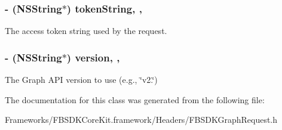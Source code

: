 \subsubsection[{token\+String}]{\setlength{\rightskip}{0pt plus 5cm}-\/ (N\+S\+String$\ast$) token\+String\hspace{0.3cm}{\ttfamily [read]}, {\ttfamily [nonatomic]}, {\ttfamily [copy]}}\label{interface_f_b_s_d_k_graph_request_a96c19ad8e7bb79261467b812a70ef2c9}
The access token string used by the request. \hypertarget{interface_f_b_s_d_k_graph_request_a651d49b68ef87318eddd8d794843d165}{}
\subsubsection[{version}]{\setlength{\rightskip}{0pt plus 5cm}-\/ (N\+S\+String$\ast$) version\hspace{0.3cm}{\ttfamily [read]}, {\ttfamily [nonatomic]}, {\ttfamily [copy]}}\label{interface_f_b_s_d_k_graph_request_a651d49b68ef87318eddd8d794843d165}
The Graph A\+P\+I version to use (e.\+g., \char`\"{}v2.\char`\"{}) 

The documentation for this class was generated from the following file\+:\begin{DoxyCompactItemize}
\item 
Frameworks/\+F\+B\+S\+D\+K\+Core\+Kit.\+framework/\+Headers/F\+B\+S\+D\+K\+Graph\+Request.\+h\end{DoxyCompactItemize}
